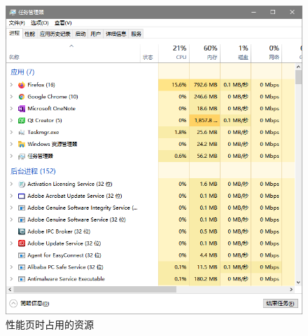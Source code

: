 \documentclass{beamer}
\begin{document}
\begin{frame}
    
\begin{figure}
    \centering
    \includegraphics[scale=0.75]{../media/performance analyze/load perftab.png}
    \caption{性能页时占用的资源}
    \label{fig:perfanaly}
\end{figure}
\end{frame}
\end{document}
